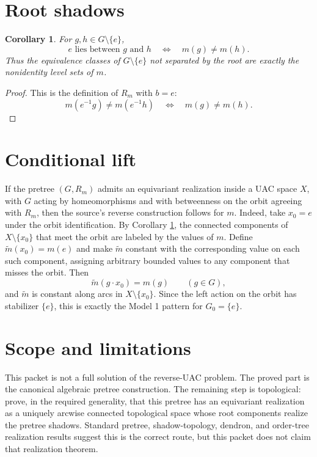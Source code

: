 \documentclass[11pt]{article}
\newtheorem{corollary}{Corollary}
\begin{document}
\section*{Root shadows}

\begin{corollary}
\label{cor:root}
For \(g,h\in G\setminus\{e\}\),
\[
  e \text{ lies between } g \text{ and } h
  \quad\Longleftrightarrow\quad
  m(g)\ne m(h).
\]
Thus the equivalence classes of \(G\setminus\{e\}\) not separated by the root
are exactly the nonidentity level sets of \(m\).
\end{corollary}

\begin{proof}
This is the definition of \(R_m\) with \(b=e\):
\[
  m(e^{-1}g)\ne m(e^{-1}h)
  \quad\Longleftrightarrow\quad
  m(g)\ne m(h).
\]
\end{proof}

\section*{Conditional lift}

If the pretree \((G,R_m)\) admits an equivariant realization inside a UAC
space \(X\), with \(G\) acting by homeomorphisms and with betweenness on the
orbit agreeing with \(R_m\), then the source's reverse construction follows
for \(m\). Indeed, take \(x_0=e\) under the orbit identification. By Corollary
\ref{cor:root}, the connected components of \(X\setminus\{x_0\}\) that meet
the orbit are labeled by the values of \(m\). Define \(\widetilde m(x_0)=m(e)\)
and make \(\widetilde m\) constant with the corresponding value on each such
component, assigning arbitrary bounded values to any component that misses the
orbit. Then
\[
  \widetilde m(g\cdot x_0)=m(g)
  \qquad(g\in G),
\]
and \(\widetilde m\) is constant along arcs in
\(X\setminus\{x_0\}\). Since the left action on the orbit has stabilizer
\(\{e\}\), this is exactly the Model 1 pattern for \(G_0=\{e\}\).

\section*{Scope and limitations}

This packet is not a full solution of the reverse-UAC problem. The proved
part is the canonical algebraic pretree construction. The remaining step is
topological: prove, in the required generality, that this pretree has an
equivariant realization as a uniquely arcwise connected topological space
whose root components realize the pretree shadows. Standard pretree,
shadow-topology, dendron, and order-tree realization results suggest this is
the correct route, but this packet does not claim that realization theorem.
\end{document}
